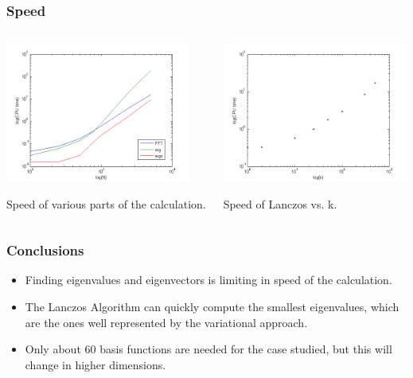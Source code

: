 \documentclass[]{beamer}
\begin{document}
\begin{frame}
  \frametitle{Speed}  

  \begin{columns}
    
    \begin{column}{0.5\textwidth}
    \centering
    
    \includegraphics[height=1.8in]{s1.png}
      
    Speed of various parts of the calculation.
  
    \end{column}
    
    \begin{column}{0.5\textwidth}
    \centering
      
    \pause  
    \includegraphics[height=1.8in]{s2.png}
    
    Speed of Lanczos vs. k.
    \end{column}
    
    \end{columns}
  
\end{frame}


\begin{frame}
  \frametitle{Conclusions}  

  \begin{itemize}
  \item<1-> Finding eigenvalues and eigenvectors is limiting in speed of the calculation.
  \item<2-> The Lanczos Algorithm can quickly compute the smallest eigenvalues, which are the ones well represented by the variational approach.
  \item<3-> Only about 60 basis functions are needed for the case studied, but this will change in higher dimensions.
  \end{itemize}
  
\end{frame}
\end{document}
